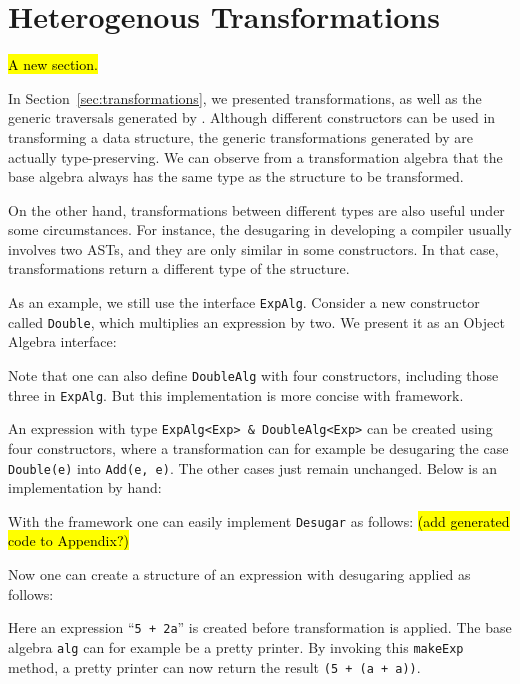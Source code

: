 \section{Heterogenous Transformations}\label{sec:heterotrans}

\hl{A new section.}

In Section~\ref{sec:transformations}, we presented transformations, as well as the generic traversals generated by \name. Although different constructors can be used in transforming a data structure, the generic transformations generated by \name are actually type-preserving. We can observe from a transformation algebra that the base algebra always has the same type as the structure to be transformed.

On the other hand, transformations between different types are also useful under some circumstances. For instance, the desugaring in developing a compiler usually involves two ASTs, and they are only similar in some constructors. In that case, transformations return a different type of the structure.

As an example, we still use the interface \lstinline{ExpAlg}. Consider a new constructor called \lstinline{Double}, which multiplies an expression by two. We present it as an Object Algebra interface:


\noindent Note that one can also define \lstinline{DoubleAlg} with four constructors, including those three in \lstinline{ExpAlg}. But this implementation is more concise with \name framework.

An expression with type \lstinline{ExpAlg<Exp> & DoubleAlg<Exp>} can be created using four constructors, where a transformation can for example be desugaring the case \lstinline{Double(e)} into \lstinline{Add(e, e)}. The other cases just remain unchanged. Below is an implementation by hand:


\noindent With the \name framework one can easily implement \lstinline{Desugar} as follows: \hl{(add generated code to Appendix?)}


\noindent Now one can create a structure of an expression with desugaring applied as follows:


\noindent Here an expression ``\lstinline{5 + 2a}'' is created before transformation is applied. The base algebra \lstinline{alg} can for example be a pretty printer. By invoking this \lstinline{makeExp} method, a pretty printer can now return the result \lstinline{(5 + (a + a))}.

